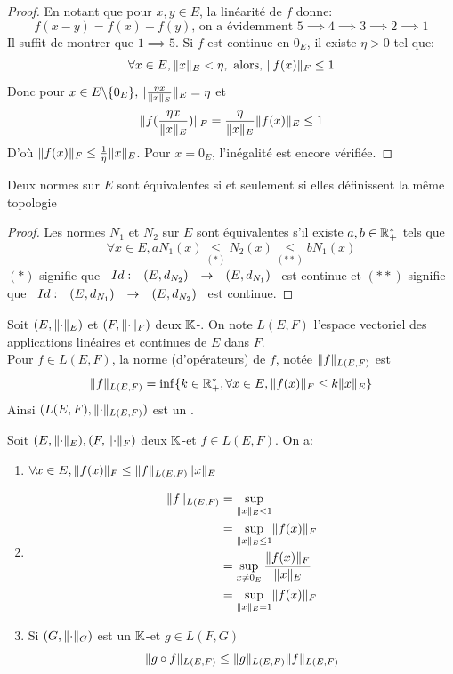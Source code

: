 \documentclass[]{report}
\begin{document}
    \begin{proof}
        En notant que pour $x,y\in E$, la linéarité de $f$ donne:
        \[f(x-y)=f(x)-f(y)\text{, on a évidemment }5\implies 4\implies 3\implies 2\implies 1\]
        Il suffit de montrer que $1\implies 5$. Si $f$ est continue en $0_E$, il existe $\eta>0$ tel que:
        \[\forall x\in E, \lVert x \rVert_E<\eta,\text{ alors, }\lVert f(x) \rVert_F\le 1\]
        Donc pour $x\in E\backslash\{0_E\},\lVert \frac{\eta x}{\lVert x \rVert_E} \rVert_E=\eta$ et
        \[\lVert f(\frac{\eta x}{\lVert x \rVert_E}) \rVert_F=\frac{\eta}{\lVert x \rVert_E}\lVert f(x) \rVert_E\le 1\]
        D'où $\lVert f(x) \rVert_F\le \frac{1}{\eta}\lVert x \rVert_E$. Pour $x=0_E$, l'inégalité est encore vérifiée.
    \end{proof}

    \begin{cor}{}{}
        Deux normes sur $E$ sont équivalentes si et seulement si elles définissent la même topologie
    \end{cor}

    \begin{proof}
        Les normes $N_1$ et $N_2$ sur $E$ sont équivalentes s'il existe $a,b\in \mathbb{R}_+^*$ tels que
        \[\forall x\in E, aN_1(x)\underset{(*)}{\le} N_2(x)\underset{(**)}{\le} bN_1(x)\]
        $(*)$ signifie que $\begin{array}{ccccc} Id : & (E,d_{N_2}) & \to & (E,d_{N_1}) \end{array}$ est continue et $(**)$ signifie que $\begin{array}{ccccc} Id : & (E,d_{N_1}) & \to & (E,d_{N_2}) \end{array}$ est continue.
    \end{proof}

    \begin{df}{}{}
        Soit $(E,\lVert \cdot \rVert_E)$ et $(F,\lVert \cdot \rVert_F)$ deux $\mathbb{K}$-\evn. On note $L(E,F)$ l'espace vectoriel des applications linéaires et continues de $E$ dans $F$.\\
        Pour $f\in L(E,F)$, la norme (d'opérateurs) de $f$, notée $\lVert f \rVert_{L(E,F)}$ est
        \[\lVert f \rVert_{L(E,F)}=\inf\{k\in \mathbb{R}_+^*,\forall x\in E, \lVert f(x) \rVert_F\le k\lVert x \rVert_E\}\]
        Ainsi $(L(E,F),\lVert \cdot \rVert_{L(E,F)})$ est un \evn.
    \end{df}

    \begin{prop}{}{}
        Soit $(E,\lVert \cdot \rVert_E), (F,\lVert \cdot \rVert_F)$ deux $\mathbb{K}$-\evn et $f\in L(E,F)$. On a:
        \begin{enumerate}
            \item $\forall x\in E, \lVert f(x) \rVert_F\le \lVert f \rVert_{L(E,F)}\lVert x \rVert_E$
            \item \begin{align*}\lVert f \rVert_{L(E,F)}&=\sup_{\lVert x \rVert_E<1}\\
                &=\sup_{\lVert x \rVert_E\le 1} \lVert f(x) \rVert_F\\
                &=\sup_{x\neq 0_E}\frac{\lVert f(x) \rVert_F}{\lVert x \rVert_E}\\
                &=\sup_{\lVert x \rVert_E=1}\lVert f(x) \rVert_F
                \end{align*}
            \item Si $(G,\lVert \cdot \rVert_G)$ est un $\mathbb{K}$-\evn et $g\in L(F,G)$
            \[\lVert g\circ f \rVert_{L(E,F)}\le \lVert g \rVert_{L(E,F)}\lVert f \rVert_{L(E,F)}\]
        \end{enumerate}
    \end{prop}
\end{document}

